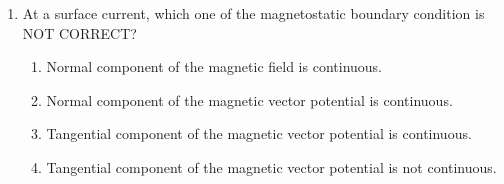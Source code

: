 \documentclass[journal,12pt,onecolumn]{IEEEtran}
\theoremstyle{remark}
\begin{document}
\begin{enumerate}
\item At a surface current, which one of the magnetostatic boundary condition is NOT CORRECT?
\hfill{}
\begin{enumerate}
\item Normal component of the magnetic field is continuous.
\item Normal component of the magnetic vector potential is continuous.
\item Tangential component of the magnetic vector potential is continuous.
\item Tangential component of the magnetic vector potential is not continuous.
\end{enumerate}


\end{enumerate}
\end{document}
